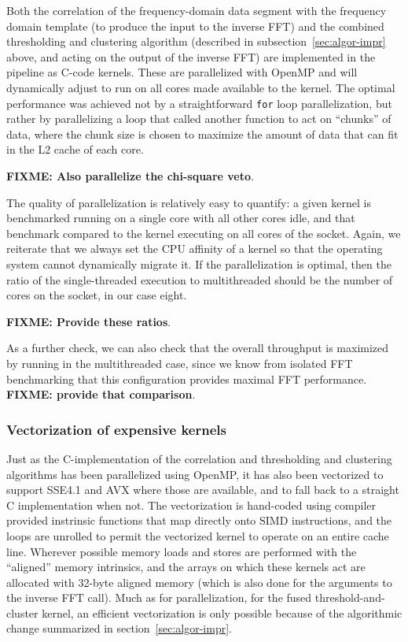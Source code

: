 \documentclass{article}
\begin{document}
Both the correlation of the frequency-domain data segment with the frequency
domain template (to produce the input to the inverse FFT) and the combined
thresholding and clustering algorithm (described in
subsection~\ref{sec:algor-impr} above, and acting on the output of the inverse
FFT) are implemented in the pipeline as C-code kernels.  These are parallelized
with OpenMP and will dynamically adjust to run on all cores made available to
the kernel. The optimal performance was achieved not by a straightforward
\texttt{for} loop parallelization, but rather by parallelizing a loop that
called another function to act on ``chunks'' of data, where the chunk size is
chosen to maximize the amount of data that can fit in the L2 cache of each
core.

\textbf{FIXME: Also parallelize the chi-square veto}.

The quality of parallelization is relatively easy to quantify: a given kernel is
benchmarked running on a single core with all other cores idle, and that
benchmark compared to the kernel executing on all cores of the socket. Again, we
reiterate that we always set the CPU affinity of a kernel so that the operating
system cannot dynamically migrate it. If the parallelization is optimal, then
the ratio of the single-threaded execution to multithreaded should be the number
of cores on the socket, in our case eight.

\textbf{FIXME: Provide these ratios}.

As a further check, we can also check that the overall throughput is maximized
by running in the multithreaded case, since we know from isolated FFT
benchmarking that this configuration provides maximal FFT
performance. \textbf{FIXME: provide that comparison}.

\subsubsection{Vectorization of expensive kernels}
\label{sec:vect-expens-kern}

Just as the C-implementation of the correlation and thresholding and clustering
algorithms has been parallelized using OpenMP, it has also been vectorized to
support SSE4.1 and AVX where those are available, and to fall back to a straight
C implementation when not. The vectorization is hand-coded using compiler
provided instrinsic functions that map directly onto SIMD instructions, and the
loops are unrolled to permit the vectorized kernel to operate on an entire cache
line. Wherever possible memory loads and stores are performed with the
``aligned'' memory intrinsics, and the arrays on which these kernels act are
allocated with 32-byte aligned memory (which is also done for the arguments to
the inverse FFT call). Much as for parallelization, for the fused
threshold-and-cluster kernel, an efficient vectorization is only possible
because of the algorithmic change summarized in section~\ref{sec:algor-impr}.
\end{document}
